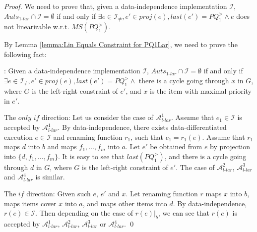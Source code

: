 \begin {proof}

We need to prove that, given a data-independence implementation $\mathcal{I}$, $\textit{Auts}_{\textit{1-lar}} \cap \mathcal{I} = \emptyset$ if and only if $\exists e \in \mathcal{I}_{\neq},e' \in \textit{proj}(e), last(e')=\textit{PQ}_1^{>} \wedge e$ does not linearizable w.r.t. $\textit{MS}(\textit{PQ}_1^{>})$.

By Lemma \ref{lemma:Lin Equals Constraint for PQ1Lar}, we need to prove the following fact:

: Given a data-independence implementation $\mathcal{I}$, $\textit{Auts}_{\textit{1-lar}} \cap \mathcal{I} = \emptyset$ if and only if $\exists e \in \mathcal{I}_{\neq},e' \in \textit{proj}(e), last(e')=\textit{PQ}_1^{>} \wedge$ there is a cycle going through $x$ in $G$, where $G$ is the left-right constraint of $e'$, and $x$ is the item with maximal priority in $e'$.

\noindent The $\textit{only if}$ direction: Let us consider the case of $\mathcal{A}_{\textit{l-lar}}^1$. Assume that $e_1 \in \mathcal{I}$ is accepted by $\mathcal{A}_{\textit{l-lar}}^1$. By data-independence, there exists data-differentiated execution $e \in \mathcal{I}$ and renaming function $r_1$, such that $e_1 = r_1(e)$. Assume that $r_1$ maps $d$ into $b$ and maps $f_1,\ldots,f_m$ into $a$. Let $e'$ be obtained from $e$ by projection into $\{ d, f_1,\ldots,f_m \}$. It is easy to see that $\textit{last}(\textit{PQ}_1^{>})$, and there is a cycle going through $d$ in $G$, where $G$ is the left-right constraint of $e'$. The case of $\mathcal{A}_{\textit{l-lar}}^2$, $\mathcal{A}_{\textit{l-lar}}^3$ and $\mathcal{A}_{\textit{l-lar}}^4$ is similar.

\noindent The $\textit{if}$ direction: Given such $e$, $e'$ and $x$. Let renaming function $r$ maps $x$ into $b$, maps items cover $x$ into $a$, and maps other items into $d$. By data-independence, $r(e) \in \mathcal{I}$. Then depending on the case of $r(e) \vert_{b}$, we can see that $r(e)$ is accepted by $\mathcal{A}_{\textit{l-lar}}^1$, $\mathcal{A}_{\textit{l-lar}}^2$, $\mathcal{A}_{\textit{l-lar}}^3$ or $\mathcal{A}_{\textit{l-lar}}^4$. \qed
\end {proof}









































